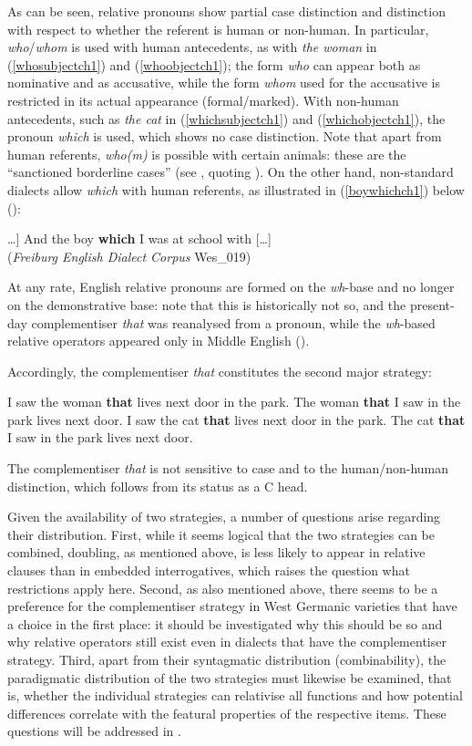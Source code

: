 As can be seen, relative pronouns show partial case distinction and distinction with respect to whether the referent is human or non-human. In particular, \textit{who}/\textit{whom} is used with human antecedents, as with \textit{the woman} in (\ref{whosubjectch1}) and (\ref{whoobjectch1}); the form \textit{who} can appear both as nominative and as accusative, while the form \textit{whom} used for the accusative is restricted in its actual appearance (formal/marked). With non-human antecedents, such as \textit{the cat} in (\ref{whichsubjectch1}) and (\ref{whichobjectch1}), the pronoun \textit{which} is used, which shows no case distinction. Note that apart from human referents, \textit{who(m)} is possible with certain animals: these are the ``sanctioned borderline cases'' (see \citealt[41]{herrmann2005}, quoting \citealt{quirkgreenbaumleechsvartvik1985}). On the other hand, non-standard dialects allow \textit{which} with human referents, as illustrated in (\ref{boywhichch1}) below (\citealt[42, ex. 4a]{herrmann2005}):

\ea {[}\ldots] And the boy \textbf{which} I was at school with [\ldots] \label{boywhichch1}\\
(\textit{Freiburg English Dialect Corpus} Wes\_019)
\z

At any rate, English relative pronouns are formed on the \textit{wh}-base and no longer on the demonstrative base: note that this is historically not so, and the present-day complementiser \textit{that} was reanalysed from a pronoun, while the \textit{wh}-based relative operators appeared only in Middle English (\citealt{vangelderen2009}).

Accordingly, the complementiser \textit{that} constitutes the second major strategy:

\ea
\ea I saw the woman \textbf{that} lives next door in the park.
\ex The woman \textbf{that} I saw in the park lives next door.
\ex I saw the cat \textbf{that} lives next door in the park.
\ex The cat \textbf{that} I saw in the park lives next door.
\z
\z

The complementiser \textit{that} is not sensitive to case and to the human/non-human distinction, which follows from its status as a C head. 

Given the availability of two strategies, a number of questions arise regarding their distribution. First, while it seems logical that the two strategies can be combined, doubling, as mentioned above, is less likely to appear in relative clauses than in embedded interrogatives, which raises the question what restrictions apply here. Second, as also mentioned above, there seems to be a preference for the complementiser strategy in West Germanic varieties that have a choice in the first place: it should be investigated why this should be so and why relative operators still exist even in dialects that have the complementiser strategy. Third, apart from their syntagmatic distribution (combinability), the paradigmatic distribution of the two strategies must likewise be examined, that is, whether the individual strategies can relativise all functions and how potential differences correlate with the featural properties of the respective items. These questions will be addressed in .


